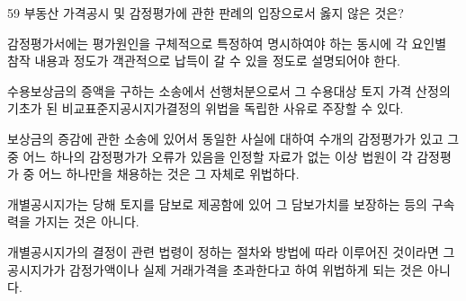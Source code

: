 \begin{question}{59}
부동산 가격공시 및 감정평가에 관한 판례의 입장으로서 옳지 않은 것은?
\begin{choices}
  \item 감정평가서에는 평가원인을 구체적으로 특정하여 명시하여야 하는 동시에 각 요인별 참작 내용과 정도가 객관적으로 납득이 갈 수 있을 정도로 설명되어야 한다.
  \item 수용보상금의 증액을 구하는 소송에서 선행처분으로서 그 수용대상 토지 가격 산정의 기초가 된 비교표준지공시지가결정의 위법을 독립한 사유로 주장할 수 있다.
  \item 보상금의 증감에 관한 소송에 있어서 동일한 사실에 대하여 수개의 감정평가가 있고 그 중 어느 하나의 감정평가가 오류가 있음을 인정할 자료가 없는 이상 법원이 각 감정평가 중 어느 하나만을 채용하는 것은 그 자체로 위법하다.
  \item 개별공시지가는 당해 토지를 담보로 제공함에 있어 그 담보가치를 보장하는 등의 구속력을 가지는 것은 아니다.
  \item 개별공시지가의 결정이 관련 법령이 정하는 절차와 방법에 따라 이루어진 것이라면 그 공시지가가 감정가액이나 실제 거래가격을 초과한다고 하여 위법하게 되는 것은 아니다.
\end{choices}
\end{question}
